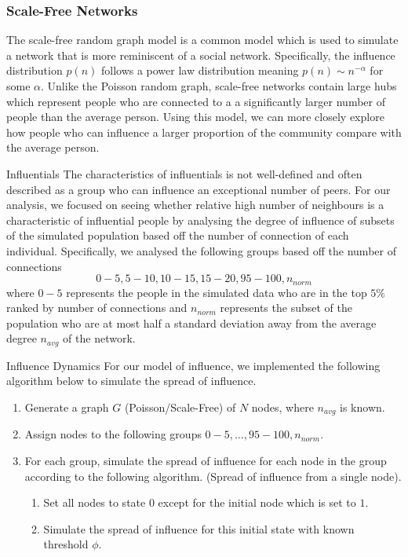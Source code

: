 \documentclass[10pt, oneside, reqno]{amsart}
\makeatletter
\theoremstyle{plain}%
\theoremstyle{definition}
\theoremstyle{remark}
\renewcommand\subsection{\@startsection{subsection}{2}%
  \z@{.5\linespacing\@plus.7\linespacing}{-.5em}%
  {\normalfont\scshape}}
\makeatother
\begin{document}
\subsubsection{Scale-Free Networks}
The scale-free random graph model is a common model which is used to simulate a network that is more reminiscent of a social network. 
Specifically, the influence distribution $p(n)$ follows a power law distribution meaning $p(n) \sim n^{-\alpha}$ for some $\alpha$.
Unlike the Poisson random graph, scale-free networks contain large hubs which represent people who are connected to a a significantly larger number of people than the average person. 
Using this model, we can more closely explore how people who can influence a larger proportion of the community compare with the average person.


\subsection{Influentials}
The characteristics of influentials is not well-defined and often described as a group who can influence an exceptional number of peers.
For our analysis, we focused on seeing whether relative high number of neighbours is a characteristic of influential people by analysing the degree of influence of subsets of the simulated population based off the number of connection of each individual.
Specifically, we analysed the following groups based off the number of connections
\[ 0-5, 5-10, 10-15, 15-20, 95-100, n_{norm} \]
where $0-5$ represents the people in the simulated data who are in the top $5\%$ ranked by number of connections and $n_{norm}$ represents the subset of the population who are at most half a standard deviation away from the average degree $n_{avg}$ of the network.




\subsection{Influence Dynamics}
For our model of influence, we implemented the following algorithm below to simulate the spread of influence\cite{github}.

\begin{enumerate}
    \item Generate a graph $G$ (Poisson/Scale-Free) of $N$ nodes, where $n_{avg}$ is known.
    \item Assign nodes to the following groups $0-5,\dots,95-100,n_{norm}$.
    \item For each group, simulate the spread of influence for each node in the group according to the following algorithm. (Spread of influence from a single node).
    \begin{enumerate}
        \item Set all nodes to state $0$ except for the initial node which is set to $1$.
        \item Simulate the spread of influence for this initial state with known threshold $\phi$.
    \end{enumerate}
\end{enumerate}
\end{document}
